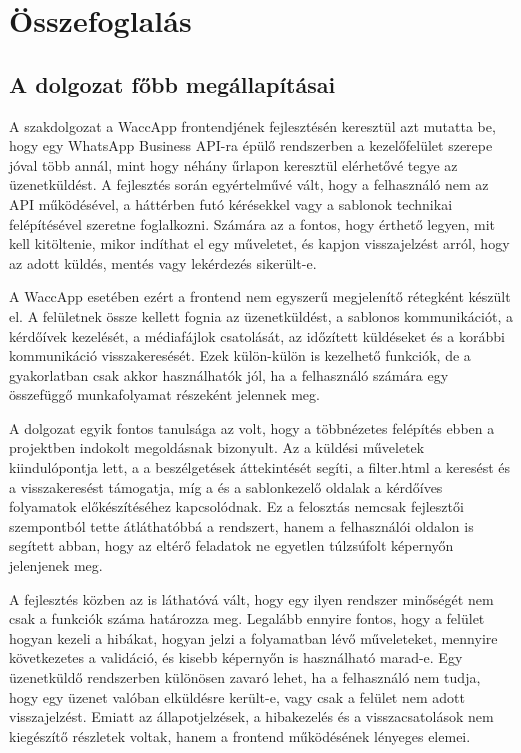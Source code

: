\chapter{Összefoglalás}

\section{A dolgozat főbb megállapításai}

A szakdolgozat a WaccApp frontendjének fejlesztésén keresztül azt mutatta be, hogy egy WhatsApp Business API-ra épülő rendszerben a kezelőfelület szerepe jóval több annál, mint hogy néhány űrlapon keresztül elérhetővé tegye az üzenetküldést. A fejlesztés során egyértelművé vált, hogy a felhasználó nem az API működésével, a háttérben futó kérésekkel vagy a sablonok technikai felépítésével szeretne foglalkozni. Számára az a fontos, hogy érthető legyen, mit kell kitöltenie, mikor indíthat el egy műveletet, és kapjon visszajelzést arról, hogy az adott küldés, mentés vagy lekérdezés sikerült-e. 

A WaccApp esetében ezért a frontend nem egyszerű megjelenítő rétegként készült el. A felületnek össze kellett fognia az üzenetküldést, a sablonos kommunikációt, a kérdőívek kezelését, a médiafájlok csatolását, az időzített küldéseket és a korábbi kommunikáció visszakeresését. Ezek külön-külön is kezelhető funkciók, de a gyakorlatban csak akkor használhatók jól, ha a felhasználó számára egy összefüggő munkafolyamat részeként jelennek meg. 

A dolgozat egyik fontos tanulsága az volt, hogy a többnézetes felépítés ebben a projektben indokolt megoldásnak bizonyult. Az  a küldési műveletek kiindulópontja lett, a  a beszélgetések áttekintését segíti, a filter.html a keresést és a visszakeresést támogatja, míg a  és a sablonkezelő oldalak a kérdőíves folyamatok előkészítéséhez kapcsolódnak. Ez a felosztás nemcsak fejlesztői szempontból tette átláthatóbbá a rendszert, hanem a felhasználói oldalon is segített abban, hogy az eltérő feladatok ne egyetlen túlzsúfolt képernyőn jelenjenek meg. 

A fejlesztés közben az is láthatóvá vált, hogy egy ilyen rendszer minőségét nem csak a funkciók száma határozza meg. Legalább ennyire fontos, hogy a felület hogyan kezeli a hibákat, hogyan jelzi a folyamatban lévő műveleteket, mennyire következetes a validáció, és kisebb képernyőn is használható marad-e. Egy üzenetküldő rendszerben különösen zavaró lehet, ha a felhasználó nem tudja, hogy egy üzenet valóban elküldésre került-e, vagy csak a felület nem adott visszajelzést. Emiatt az állapotjelzések, a hibakezelés és a visszacsatolások nem kiegészítő részletek voltak, hanem a frontend működésének lényeges elemei. 


